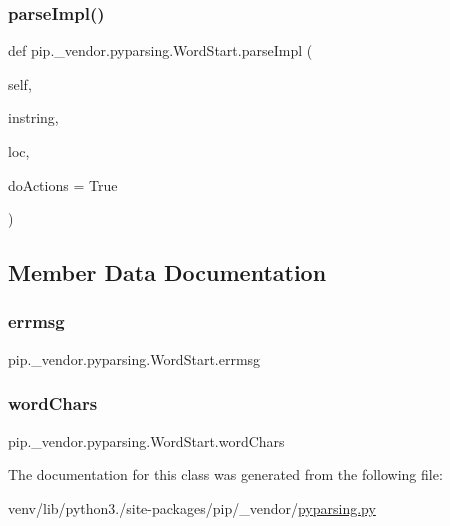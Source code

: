 \subsubsection{\texorpdfstring{parse\+Impl()}{parseImpl()}}
{\footnotesize\ttfamily def pip.\+\_\+vendor.\+pyparsing.\+Word\+Start.\+parse\+Impl (\begin{DoxyParamCaption}\item[{}]{self,  }\item[{}]{instring,  }\item[{}]{loc,  }\item[{}]{do\+Actions = {\ttfamily True} }\end{DoxyParamCaption})}



\subsection{Member Data Documentation}
\mbox{\label{classpip_1_1__vendor_1_1pyparsing_1_1WordStart_aea73b1815e1b5025b7ddf06592edc2b7}} 
\subsubsection{\texorpdfstring{errmsg}{errmsg}}
{\footnotesize\ttfamily pip.\+\_\+vendor.\+pyparsing.\+Word\+Start.\+errmsg}

\mbox{\label{classpip_1_1__vendor_1_1pyparsing_1_1WordStart_ae133aef6271fe43321ef7c85f2a02aef}} 
\subsubsection{\texorpdfstring{word\+Chars}{wordChars}}
{\footnotesize\ttfamily pip.\+\_\+vendor.\+pyparsing.\+Word\+Start.\+word\+Chars}



The documentation for this class was generated from the following file\+:\begin{DoxyCompactItemize}
\item 
venv/lib/python3./site-\/packages/pip/\+\_\+vendor/\hyperlink{pip_2__vendor_2pyparsing_8py}{pyparsing.\+py}\end{DoxyCompactItemize}
